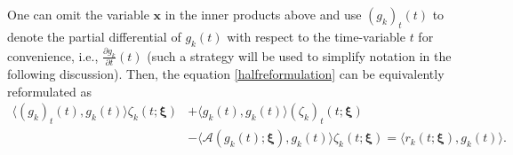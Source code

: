 \documentclass[10pt,a4paper]{article}
\numberwithin{equation}{section}
\numberwithin{lemma}{section}
\numberwithin{example}{section}
\numberwithin{definition}{section}
\numberwithin{assumption}{section}
\numberwithin{theorem}{section}
\numberwithin{proposition}{section}
\numberwithin{corollary}{section}
\numberwithin{remark}{section}
\begin{document}
One can omit the variable $\bm{x}$ in the inner products above and use $(g_k)_t(t)$ to denote the partial differential of $g_k(t)$ with respect to the time-variable $t$ for convenience, i.e., $\frac{\partial g_k}{\partial t}(t)$ (such a strategy will be used to simplify notation in the following discussion).
Then, the equation  \eqref{halfreformulation} can be equivalently reformulated as
\begin{equation}
    \label{eq-linear-rode}
    \begin{aligned}
        \langle (g_k)_t(t),g_k(t)\rangle \zeta_k(t;\bm{\xi})&+
        \langle g_k(t),g_k(t)\rangle (\zeta_k)_t(t;\bm{\xi})
        \\&-\langle \mathcal{A}(g_k(t);\bm{\xi}),g_k(t)\rangle \zeta_k(t;\bm{\xi})=\langle r_k(t;\bm{\xi}),g_k(t)\rangle.
    \end{aligned}
\end{equation}
\end{document}
